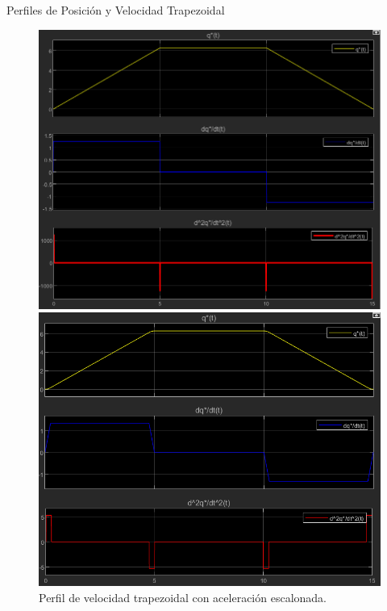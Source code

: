 \documentclass[12pt]{beamer}
\begin{document}
\begin{frame}{Perfiles de Posición y Velocidad Trapezoidal}

    \begin{figure}
        \centering
        \begin{minipage}{0.48\textwidth}
            \includegraphics[width=\textwidth]{Imagenes/PosicionTrapezoidal.png}
            \caption{Perfil de posición trapezoidal con velocidad escalonada.}
            \label{fig:PosicionTrapezoidal}
        \end{minipage}
        \hfill
        \begin{minipage}{0.48\textwidth}
            \includegraphics[width=\textwidth]{Imagenes/VelocidadTrapezoidal.png}
            \caption{Perfil de velocidad trapezoidal con aceleración escalonada.}
            \label{fig:VelocidadTrapezoidal}
        \end{minipage}
    \end{figure}
\end{frame}
\end{document}
